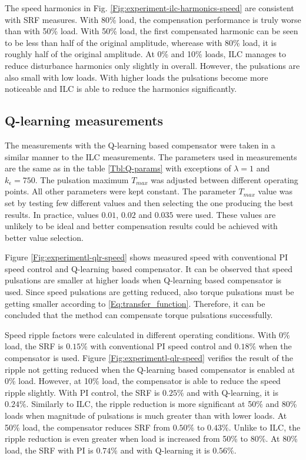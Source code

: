 The speed harmonics in Fig. \ref{Fig:experiment-ilc-harmonics-speed} are consistent with SRF measures. With 80\% load, the compensation performance is truly worse than with 50\% load. With 50\% load, the first compensated harmonic can be seen to be less than half of the original amplitude, wherease with 80\% load, it is roughly half of the original amplitude. At 0\% and 10\% loads, ILC manages to reduce disturbance harmonics only slightly in overall. However, the pulsations are also small with low loads. With higher loads the pulsations become more noticeable and ILC is able to reduce the harmonics significantly.


\subsection{Q-learning measurements}
The measurements with the Q-learning based compensator were taken in a similar manner to the ILC measurements. The parameters used in measurements are the same as in the table \ref{Tbl:Q-params} with exceptions of $\lambda = 1$ and $k_\epsilon = 750$. The pulsation maximum $T_{max}$ was adjusted between different operating points. All other parameters were kept constant. The parameter $T_{max}$ value was set by testing few different values and then selecting the one producing the best results. In practice, values $0.01$, $0.02$ and $0.035$ were used. These values are unlikely to be ideal and better compensation results could be achieved with better value selection.

Figure \ref{Fig:experimentl-qlr-speed} shows measured speed with conventional PI speed control and Q-learning based compensator. It can be observed that speed pulsations are smaller at higher loads when Q-learning based compensator is used. Since speed pulsations are getting reduced, also torque pulsations must be getting smaller according to \eqref{Eq:transfer_function}. Therefore, it can be concluded that the method can compensate torque pulsations successfully.

Speed ripple factors were calculated in different operating conditions. With 0\% load, the SRF is $0.15\%$ with conventional PI speed control and $0.18\%$ when the compensator is used. Figure \ref{Fig:experimentl-qlr-speed} verifies the result of the ripple not getting reduced when the Q-learning based compensator is enabled at 0\% load. However, at 10\% load, the compensator is able to reduce the speed ripple slightly. With PI control, the SRF is $0.25\%$ and with Q-learning, it is $0.24\%$. Similarly to ILC, the ripple reduction is more significant at 50\% and 80\% loads when magnitude of pulsations is much greater than with lower loads. At 50\% load, the compensator reduces SRF from $0.50\%$ to $0.43\%$. Unlike to ILC, the ripple reduction is even greater when load is increased from 50\% to 80\%. At 80\% load, the SRF with PI is $0.74\%$ and with Q-learning it is $0.56\%$.

